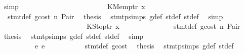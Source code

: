 \begin{isabellebody}
\ simp\isanewline
\ \ \ \ \ \ \ \ \ \ \isamarkupfalse%
\isanewline
\ \ \ \ \ \ \ \ \ \ \ \ \isamarkupfalse%
\ {\isacharparenleft}{\kern0pt}KMemptr\ x{}{\isacharparenright}{\kern0pt}\isanewline
\ \ \ \ \ \ \ \ \ \ \ \ \isamarkupfalse%
\ {}{\isacharparenleft}{\kern0pt}{}{\isacharparenright}{\kern0pt}\ stmt{\isacharunderscore}{\kern0pt}def\ gcost\ n\ Pair\ \isamarkupfalse%
\ {\isacharquery}{\kern0pt}thesis\ \isamarkupfalse%
\ stmt{\isachardot}{\kern0pt}psimps{\isacharparenleft}{\kern0pt}{}{\isacharparenright}{\kern0pt}\ g{\isacharunderscore}{\kern0pt}def\ st{\isacharprime}{\kern0pt}{\isacharunderscore}{\kern0pt}def\ st{\isacharprime}{\kern0pt}{\isacharprime}{\kern0pt}{\isacharunderscore}{\kern0pt}def\ \isamarkupfalse%
\ simp\isanewline
\ \ \ \ \ \ \ \ \ \ \isamarkupfalse%
\isanewline
\ \ \ \ \ \ \ \ \ \ \ \ \isamarkupfalse%
\ {\isacharparenleft}{\kern0pt}KStoptr\ x{}{\isacharparenright}{\kern0pt}\isanewline
\ \ \ \ \ \ \ \ \ \ \ \ \isamarkupfalse%
\ {}{\isacharparenleft}{\kern0pt}{}{\isacharparenright}{\kern0pt}\ stmt{\isacharunderscore}{\kern0pt}def\ gcost\ n\ Pair\ \isamarkupfalse%
\ {\isacharquery}{\kern0pt}thesis\ \isamarkupfalse%
\ stmt{\isachardot}{\kern0pt}psimps{\isacharparenleft}{\kern0pt}{}{\isacharparenright}{\kern0pt}\ g{\isacharunderscore}{\kern0pt}def\ st{\isacharprime}{\kern0pt}{\isacharunderscore}{\kern0pt}def\ st{\isacharprime}{\kern0pt}{\isacharprime}{\kern0pt}{\isacharunderscore}{\kern0pt}def\ \isamarkupfalse%
\ simp\isanewline
\ \ \ \ \ \ \ \ \ \ \isamarkupfalse%
\isanewline
\ \ \ \ \ \ \ \ \isamarkupfalse%
\isanewline
\ \ \ \ \ \ \isamarkupfalse%
\isanewline
\ \ \ \ \ \ \ \ \isamarkupfalse%
\ {\isacharparenleft}{\kern0pt}e\ e{\isacharparenright}{\kern0pt}\isanewline
\ \ \ \ \ \ \ \ \isamarkupfalse%
\ {}{\isacharparenleft}{\kern0pt}{}{\isacharparenright}{\kern0pt}\ stmt{\isacharunderscore}{\kern0pt}def\ gcost\ \isamarkupfalse%
\ {\isacharquery}{\kern0pt}thesis\ \isamarkupfalse%
\ stmt{\isachardot}{\kern0pt}psimps{\isacharparenleft}{\kern0pt}{}{\isacharparenright}{\kern0pt}\ g{\isacharunderscore}{\kern0pt}def\ st{\isacharprime}{\kern0pt}{\isacharunderscore}{\kern0pt}def\ \isamarkupfalse%

\end{isabellebody}
